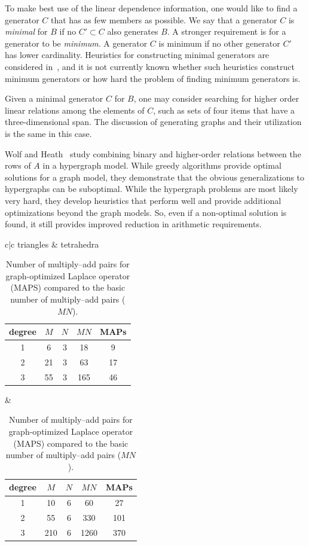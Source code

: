 To make best use of the linear dependence information, one would like
to find a generator \( C \) that has as few members as possible.  We
say that a generator \( C \) is \emph{minimal} for $B$ if no \( C'
\subset C \) also generates \( B \). A stronger requirement is for a
generator to be \emph{minimum}. A generator $C$ is minimum if no other
generator $C'$ has lower cardinality. Heuristics for constructing
minimal generators are considered in~\cite{KirSco2007}, and it is not
currently known whether such heuristics construct minimum generators
or how hard the problem of finding minimum generators is.

Given a minimal generator \( C \) for \( B \), one may consider
searching for higher order linear relations among the elements of \(
C \), such as sets of four items that have a three-dimensional span.
The discussion of generating graphs and their utilization is the same
in this case.

Wolf and Heath~\cite{WolfHeath2009} study combining binary and
higher-order relations between the rows of \( A \) in a hypergraph
model.  While greedy algorithms provide optimal solutions for a graph
model, they demonstrate that the obvious generalizations to
hypergraphs can be suboptimal.  While the hypergraph problems are most
likely very hard, they develop heuristics that perform well and
provide additional optimizations beyond the graph models.  So, even if
a non-optimal solution is found, it still provides improved reduction
in arithmetic requirements.

\begin{table}
  \begin{center}
    \begin{tabular}{c|c}
      triangles & tetrahedra \\
      \begin{tabular}{c|ccc|c}\hline
        degree & $M$ & $N$ & $MN$ & MAPs \\
        \hline
        1 &6 &3& 18& 9 \\
        2 &21& 3& 63& 17\\
        3 &55& 3& 165& 46 \\\hline
      \end{tabular}
      &
      \begin{tabular}{c|ccc|c}\hline
        degree & $M$ & $N$ & $MN$ & MAPs \\
        \hline
        1 & 10 & 6 &60 &27 \\
        2 & 55 & 6 & 330 &101 \\
        3 & 210 &6 &1260 &370 \\\hline
      \end{tabular}
    \end{tabular}
    \label{tab:kirby4:graph}
    \caption{Number of multiply--add pairs for graph-optimized Laplace
      operator (MAPS) compared to the basic number of multiply--add pairs ($MN$).}
  \end{center}
\end{table}

